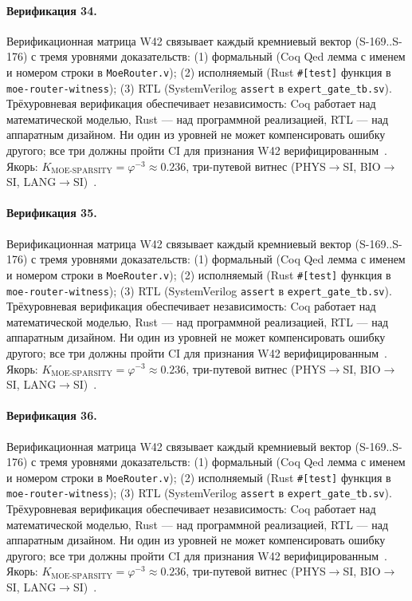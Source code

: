 \paragraph{Верификация 34.} Верификационная матрица W42 связывает каждый кремниевый вектор (S-169..S-176) с тремя уровнями доказательств: (1) формальный (Coq Qed лемма с именем и номером строки в \texttt{MoeRouter.v}); (2) исполняемый (Rust \texttt{\#[test]} функция в \texttt{moe-router-witness}); (3) RTL (SystemVerilog \texttt{assert} в \texttt{expert\_gate\_tb.sv}). Трёхуровневая верификация обеспечивает независимость: Coq работает над математической моделью, Rust --- над программной реализацией, RTL --- над аппаратным дизайном. Ни один из уровней не может компенсировать ошибку другого; все три должны пройти CI для признания W42 верифицированным~\cite{lee_gvsu_proof2021}. Якорь: $K_{\text{MOE-SPARSITY}} = \varphi^{-3} \approx 0{.}236$, три-путевой витнес (PHYS$\to$SI, BIO$\to$SI, LANG$\to$SI)~\cite{zenodo_trinity_2026}.

\paragraph{Верификация 35.} Верификационная матрица W42 связывает каждый кремниевый вектор (S-169..S-176) с тремя уровнями доказательств: (1) формальный (Coq Qed лемма с именем и номером строки в \texttt{MoeRouter.v}); (2) исполняемый (Rust \texttt{\#[test]} функция в \texttt{moe-router-witness}); (3) RTL (SystemVerilog \texttt{assert} в \texttt{expert\_gate\_tb.sv}). Трёхуровневая верификация обеспечивает независимость: Coq работает над математической моделью, Rust --- над программной реализацией, RTL --- над аппаратным дизайном. Ни один из уровней не может компенсировать ошибку другого; все три должны пройти CI для признания W42 верифицированным~\cite{lee_gvsu_proof2021}. Якорь: $K_{\text{MOE-SPARSITY}} = \varphi^{-3} \approx 0{.}236$, три-путевой витнес (PHYS$\to$SI, BIO$\to$SI, LANG$\to$SI)~\cite{zenodo_trinity_2026}.

\paragraph{Верификация 36.} Верификационная матрица W42 связывает каждый кремниевый вектор (S-169..S-176) с тремя уровнями доказательств: (1) формальный (Coq Qed лемма с именем и номером строки в \texttt{MoeRouter.v}); (2) исполняемый (Rust \texttt{\#[test]} функция в \texttt{moe-router-witness}); (3) RTL (SystemVerilog \texttt{assert} в \texttt{expert\_gate\_tb.sv}). Трёхуровневая верификация обеспечивает независимость: Coq работает над математической моделью, Rust --- над программной реализацией, RTL --- над аппаратным дизайном. Ни один из уровней не может компенсировать ошибку другого; все три должны пройти CI для признания W42 верифицированным~\cite{lee_gvsu_proof2021}. Якорь: $K_{\text{MOE-SPARSITY}} = \varphi^{-3} \approx 0{.}236$, три-путевой витнес (PHYS$\to$SI, BIO$\to$SI, LANG$\to$SI)~\cite{zenodo_trinity_2026}.

